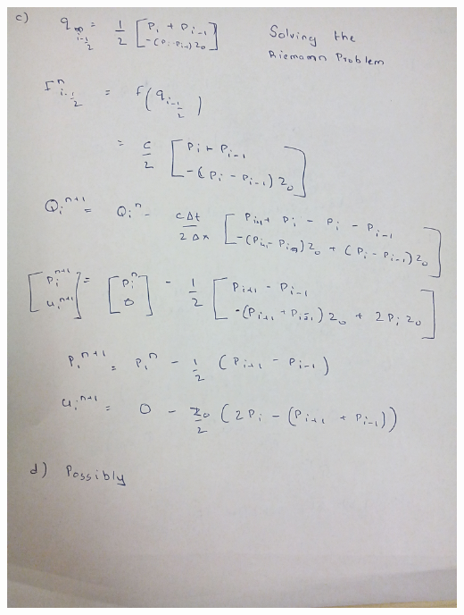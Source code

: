\documentclass[11pt]{article}
\begin{document}
\begin{enumerate}[label=(\alph*)]
\hfil\includegraphics[width=6.5in]{4}\hfil
\end{enumerate}


\end{document}
